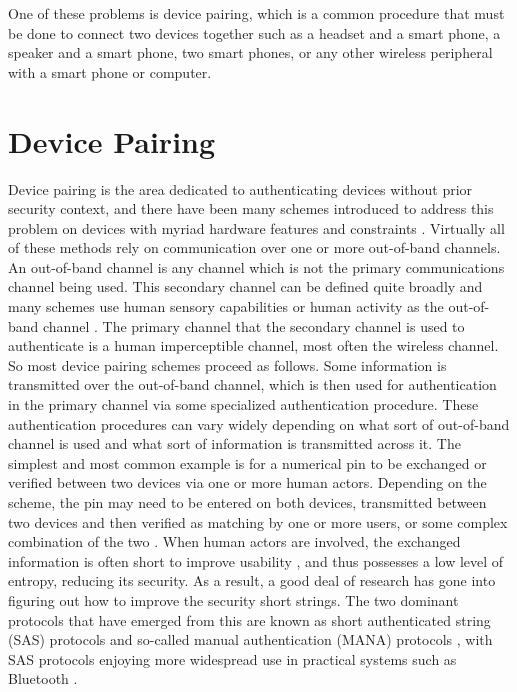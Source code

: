 \documentclass[12pt]{report}
\begin{document}
One of these problems is device pairing, which is a common procedure that must be done to connect two devices together such as a headset and a smart phone, a speaker and a smart phone, two smart phones, or any other wireless peripheral with a smart phone or computer. \par

\section{Device Pairing}
Device pairing is the area dedicated to authenticating devices without prior security context, and there have been many schemes introduced to address this problem on devices with myriad hardware features and constraints \cite{PlayfulPairingGallego2011,BedaSoriente2007,ShakeWellBeforeUseMayrhofer2009,SeeingIsBelievingMcCune2005,TalkingToStrangersSmetters2002,LoudAndClearGoodrich2006,HapadepSoriente2008,VisualChannelPairingSaxena2006}. Virtually all of these methods rely on communication over one or more out-of-band channels. An out-of-band channel is any channel which is not the primary communications channel being used. This secondary channel can be defined quite broadly and many schemes use human sensory capabilities or human activity as the out-of-band channel \cite{SimplePairingAnalysisBluetooth4Phan2010,AliceMeetsBobKumar2009}. The primary channel that the secondary channel is used to authenticate is a human imperceptible channel, most often the wireless channel. So most device pairing schemes proceed as follows. Some information is transmitted over the out-of-band channel, which is then used for authentication in the primary channel via some specialized authentication procedure. These authentication procedures can vary widely depending on what sort of out-of-band channel is used and what sort of information is transmitted across it. The simplest and most common example is for a numerical pin to be exchanged or verified between two devices via one or more human actors. Depending on the scheme, the pin may need to be entered on both devices, transmitted between two devices and then verified as matching by one or more users, or some complex combination of the two \cite{Bluetooth40Spec2010,BluetoothInterfaceFlowSecureSimplePairing2007,JournalCompStudySecurePairingKumar2009}. When human actors are involved, the exchanged information is often short to improve usability \cite{BluetoothInterfaceFlowSecureSimplePairing2007}, and thus possesses a low level of entropy, reducing its security. As a result, a good deal of research has gone into figuring out how to improve the security short strings. The two dominant protocols that have emerged from this are known as short authenticated string (SAS) protocols \cite{SASVaudenay2005} and so-called manual authentication (MANA) protocols \cite{ManaGehrmann2004}, with SAS protocols enjoying more widespread use in practical systems such as Bluetooth \cite{Bluetooth40Spec2010}. \par
\end{document}
